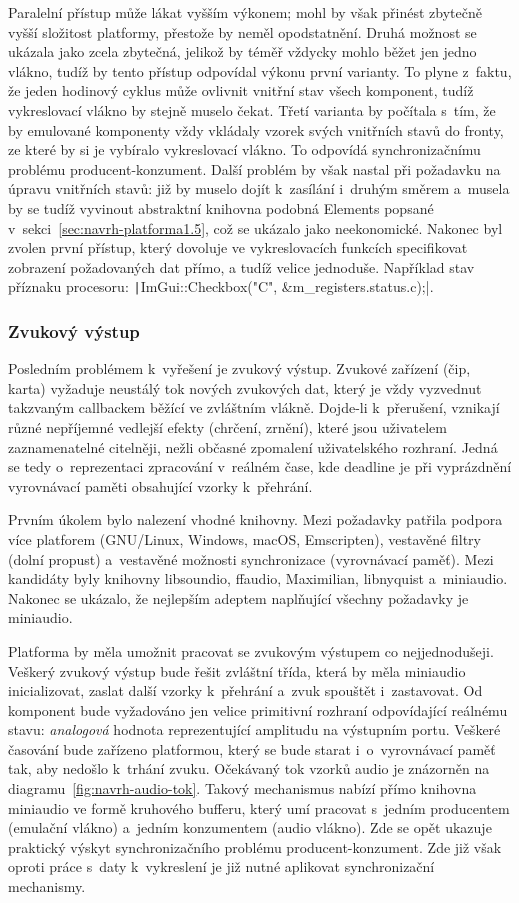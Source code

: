 Paralelní přístup může lákat vyšším výkonem; mohl by však přinést zbytečně vyšší složitost platformy, přestože by neměl opodstatnění. Druhá možnost se ukázala jako zcela zbytečná, jelikož by téměř vždycky mohlo běžet jen jedno vlákno, tudíž by tento přístup odpovídal výkonu první varianty. To plyne z~faktu, že jeden hodinový cyklus může ovlivnit vnitřní stav všech komponent, tudíž vykreslovací vlákno by stejně muselo čekat. Třetí varianta by počítala s~tím, že by emulované komponenty vždy vkládaly vzorek svých vnitřních stavů do fronty, ze které by si je vybíralo vykreslovací vlákno. To odpovídá synchronizačnímu problému producent-konzument. Další problém by však nastal při požadavku na úpravu vnitřních stavů: již by muselo dojít k~zasílání i~druhým směrem a~musela by se tudíž vyvinout abstraktní knihovna podobná Elements popsané v~sekci~\ref{sec:navrh-platforma1.5}, což se ukázalo jako neekonomické. Nakonec byl zvolen první přístup, který dovoluje ve vykreslovacích funkcích specifikovat zobrazení požadovaných dat přímo, a tudíž velice jednoduše. Například stav příznaku procesoru: \texttt|ImGui::Checkbox("C", &m_registers.status.c);|.

\subsubsection{Zvukový výstup}
Posledním problémem k~vyřešení je zvukový výstup. Zvukové zařízení (čip, karta) vyžaduje neustálý tok nových zvukových dat, který je vždy vyzvednut takzvaným callbackem běžící ve zvláštním vlákně. Dojde-li k~přerušení, vznikají různé nepříjemné vedlejší efekty (chrčení, zrnění), které jsou uživatelem zaznamenatelné citelněji, nežli občasné zpomalení uživatelského rozhraní. Jedná se tedy o~reprezentaci zpracování v~reálném čase, kde deadline je při vyprázdnění vyrovnávací paměti obsahující vzorky k~přehrání.

Prvním úkolem bylo nalezení vhodné knihovny. Mezi požadavky patřila podpora více platforem (GNU/Linux, Windows, macOS, Emscripten), vestavěné filtry (dolní propust) a~vestavěné možnosti synchronizace (vyrovnávací paměť). Mezi kandidáty byly knihovny libsoundio, ffaudio, Maximilian, libnyquist a~miniaudio. Nakonec se ukázalo, že nejlepším adeptem naplňující všechny požadavky je miniaudio.

Platforma by měla umožnit pracovat se zvukovým výstupem co nejjednodušeji. Veškerý zvukový výstup bude řešit zvláštní třída, která by měla miniaudio inicializovat, zaslat další vzorky k~přehrání a~zvuk spouštět i~zastavovat. Od komponent bude vyžadováno jen velice primitivní rozhraní odpovídající reálnému stavu: \emph{analogová} hodnota reprezentující amplitudu na výstupním portu. Veškeré časování bude zařízeno platformou, který se bude starat i~o~vyrovnávací paměť tak, aby nedošlo k~trhání zvuku. Očekávaný tok vzorků audio je znázorněn na diagramu~\ref{fig:navrh-audio-tok}. Takový mechanismus nabízí přímo knihovna miniaudio ve formě kruhového bufferu, který umí pracovat s~jedním producentem (emulační vlákno) a~jedním konzumentem (audio vlákno). Zde se opět ukazuje praktický výskyt synchronizačního problému producent-konzument. Zde již však oproti práce s~daty k~vykreslení je již nutné aplikovat synchronizační mechanismy.


